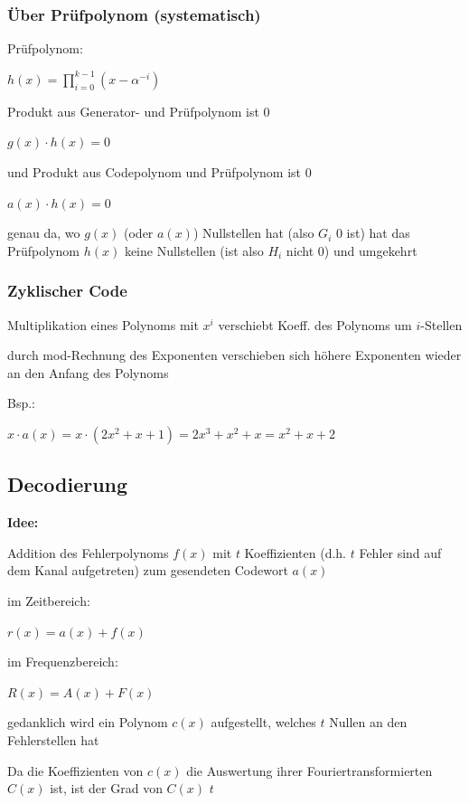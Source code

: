 \subsubsection{Über Prüfpolynom (systematisch)}

Prüfpolynom:

$\displaystyle{
    h(x) = \prod_{i=0}^{k-1} \left(x - \alpha^{-i}\right)
}$

Produkt aus Generator- und Prüfpolynom ist 0

$\displaystyle{
    g(x) \cdot h(x) = 0
}$

und Produkt aus Codepolynom und Prüfpolynom ist 0

$\displaystyle{
    a(x) \cdot h(x) = 0
}$

genau da, wo $g(x)$ (oder $a(x)$) Nullstellen hat (also $G_i$ 0 ist) hat das Prüfpolynom $h(x)$ keine Nullstellen
(ist also $H_i$ nicht 0) und umgekehrt

\subsubsection{Zyklischer Code}

Multiplikation eines Polynoms mit $x^i$ verschiebt Koeff. des Polynoms um $i$-Stellen

durch mod-Rechnung des Exponenten verschieben sich höhere Exponenten wieder an den Anfang des Polynoms

Bsp.:

$\displaystyle{
    x \cdot a(x) = x \cdot ( 2x^2 + x + 1 ) = 2x^3 + x^2 + x = x^2 + x + 2
}$

\subsection{Decodierung}

\textbf{Idee:}

Addition des Fehlerpolynoms $f(x)$ mit $t$ Koeffizienten (d.h. $t$ Fehler sind auf dem Kanal aufgetreten)
zum gesendeten Codewort $a(x)$

im Zeitbereich:

$\displaystyle{
    r(x) = a(x) + f(x)
}$

im Frequenzbereich:

$\displaystyle{
    R(x) = A(x) + F(x)
}$

gedanklich wird ein Polynom $c(x)$ aufgestellt, welches $t$ Nullen an den Fehlerstellen hat

Da die Koeffizienten von $c(x)$ die Auswertung ihrer Fouriertransformierten $C(x)$ ist, ist der Grad
von $C(x)$ $t$

